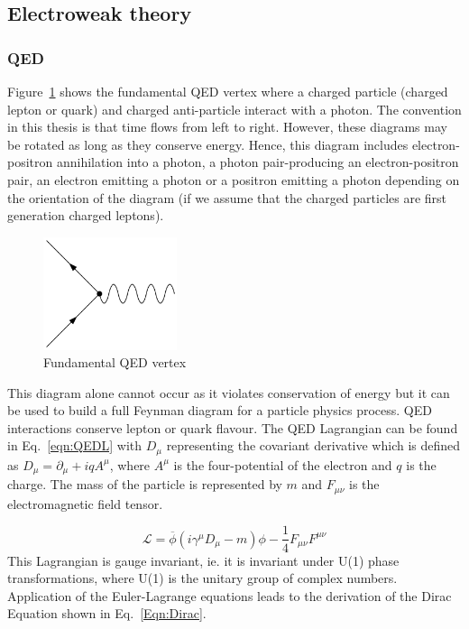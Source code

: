 \subsection{Electroweak theory}

\subsubsection{QED}
\label{subsec:QED}

Figure~\ref{fig:QEDvertex} shows the fundamental QED vertex where a charged particle (charged lepton or quark) and charged anti-particle interact with a photon. The convention in this thesis is that time flows from left to right. However, these diagrams may be rotated as long as they conserve energy. Hence, this diagram includes electron-positron annihilation into a photon, a photon pair-producing an electron-positron pair, an electron emitting a photon or a positron emitting a photon depending on the orientation of the diagram (if we assume that the charged particles are first generation charged leptons). 

\begin{figure}[ht!]
\begin{center}
    \includegraphics[width=0.35\textwidth]{images/Theory/QEDvertex.png}
    \caption{Fundamental QED vertex}
    \label{fig:QEDvertex}
\end{center}
\end{figure}

This diagram alone cannot occur as it violates conservation of energy but it can be used to build a full Feynman diagram for a particle physics process. QED interactions conserve lepton or quark flavour. 
The QED Lagrangian can be found in Eq.~\ref{eqn:QEDL} with $D_{\mu}$ representing the covariant derivative which is defined as $D_{\mu} = \partial_{\mu} + iqA^{\mu}$, where $A^{\mu}$ is the four-potential of the electron and $q$ is the charge. The mass of the particle is represented by $m$ and $F_{\mu\nu}$ is the electromagnetic field tensor.

\begin{equation}
\mathcal{L} = \overline{\phi}\left(i\gamma^{\mu}D_{\mu}-m\right)\phi - \frac{1}{4}F_{\mu\nu}F^{\mu\nu}
\label{eqn:QEDL}
\end{equation}
This Lagrangian is gauge invariant, ie. it is invariant under U(1) phase transformations, where U(1) is the unitary group of complex numbers. Application of the Euler-Lagrange equations leads to the derivation of the Dirac Equation shown in Eq.~\ref{Eqn:Dirac}.

